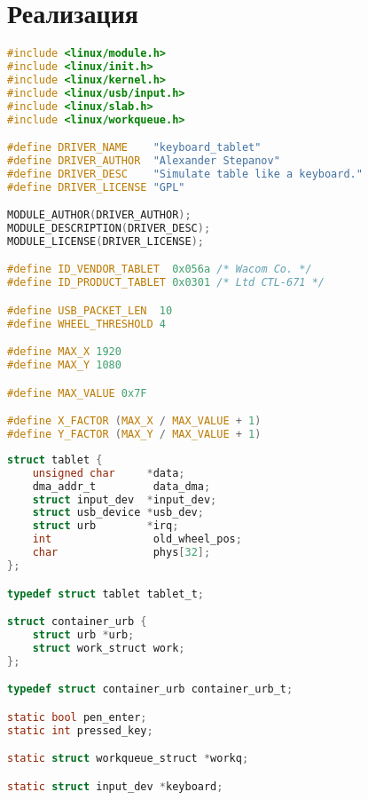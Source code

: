 \chapter{Реализация}

\begin{lstlisting}[language=c,caption=Объявление начальных макросов,label=lst:macros]
#include <linux/module.h>
#include <linux/init.h>
#include <linux/kernel.h>
#include <linux/usb/input.h>
#include <linux/slab.h>
#include <linux/workqueue.h>

#define DRIVER_NAME    "keyboard_tablet"
#define DRIVER_AUTHOR  "Alexander Stepanov"
#define DRIVER_DESC    "Simulate table like a keyboard."
#define DRIVER_LICENSE "GPL"

MODULE_AUTHOR(DRIVER_AUTHOR);
MODULE_DESCRIPTION(DRIVER_DESC);
MODULE_LICENSE(DRIVER_LICENSE);

#define ID_VENDOR_TABLET  0x056a /* Wacom Co. */
#define ID_PRODUCT_TABLET 0x0301 /* Ltd CTL-671 */

#define USB_PACKET_LEN  10
#define WHEEL_THRESHOLD 4

#define MAX_X 1920
#define MAX_Y 1080

#define MAX_VALUE 0x7F

#define X_FACTOR (MAX_X / MAX_VALUE + 1)
#define Y_FACTOR (MAX_Y / MAX_VALUE + 1)
\end{lstlisting}

\begin{lstlisting}[language=c,caption=Объявление структур и глобальных переменных,label=lst:structs]
struct tablet {
    unsigned char     *data;
    dma_addr_t         data_dma;
    struct input_dev  *input_dev;
    struct usb_device *usb_dev;
    struct urb        *irq;
    int                old_wheel_pos;
    char               phys[32];
};

typedef struct tablet tablet_t;

struct container_urb {
    struct urb *urb;
    struct work_struct work;
};

typedef struct container_urb container_urb_t;

static bool pen_enter;
static int pressed_key;

static struct workqueue_struct *workq;

static struct input_dev *keyboard;
\end{lstlisting}

